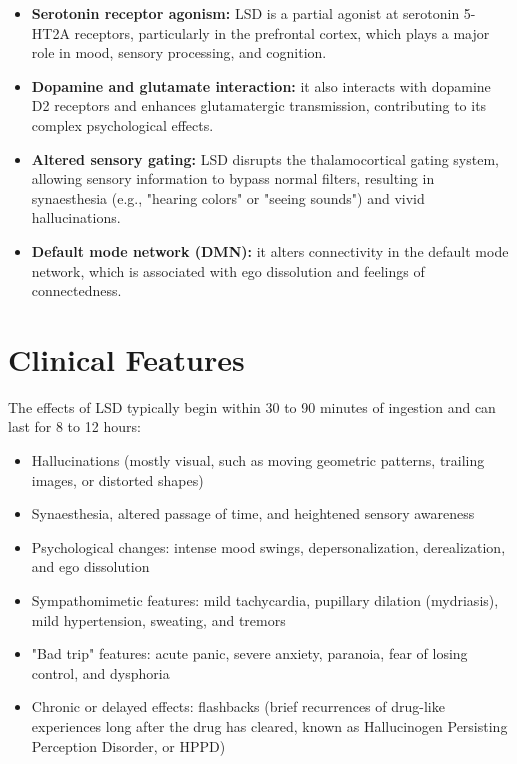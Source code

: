 \begin{itemize}
    \item \textbf{Serotonin receptor agonism:} LSD is a partial agonist at serotonin 5-HT2A receptors, particularly in the prefrontal cortex, which plays a major role in mood, sensory processing, and cognition.
    \item \textbf{Dopamine and glutamate interaction:} it also interacts with dopamine D2 receptors and enhances glutamatergic transmission, contributing to its complex psychological effects.
    \item \textbf{Altered sensory gating:} LSD disrupts the thalamocortical gating system, allowing sensory information to bypass normal filters, resulting in synaesthesia (e.g., "hearing colors" or "seeing sounds") and vivid hallucinations.
    \item \textbf{Default mode network (DMN):} it alters connectivity in the default mode network, which is associated with ego dissolution and feelings of connectedness.
\end{itemize}

\section*{Clinical Features}
The effects of LSD typically begin within 30 to 90 minutes of ingestion and can last for 8 to 12 hours:

\begin{itemize}
    \item Hallucinations (mostly visual, such as moving geometric patterns, trailing images, or distorted shapes)
    \item Synaesthesia, altered passage of time, and heightened sensory awareness
    \item Psychological changes: intense mood swings, depersonalization, derealization, and ego dissolution
    \item Sympathomimetic features: mild tachycardia, pupillary dilation (mydriasis), mild hypertension, sweating, and tremors
    \item "Bad trip" features: acute panic, severe anxiety, paranoia, fear of losing control, and dysphoria
    \item Chronic or delayed effects: flashbacks (brief recurrences of drug-like experiences long after the drug has cleared, known as Hallucinogen Persisting Perception Disorder, or HPPD)
\end{itemize}

